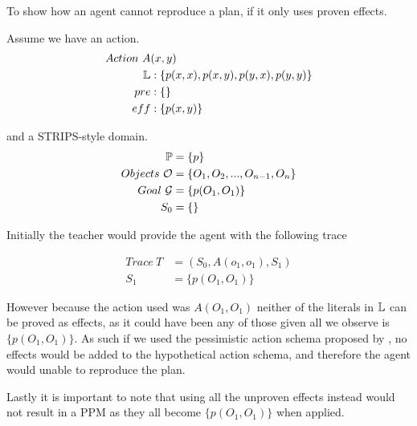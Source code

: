 \documentclass[\master/Master.tex]{subfiles}
\begin{document}
	\begin{example}
		To show how an agent cannot reproduce a plan, if it only uses proven effects.
		
		Assume we have an action.
		\begin{equation*}
			\begin{split}
				Action ~ A &(x, y) \\
					\mathbb{L}&: \{ p(x,x), p(x,y), p(y,x), p(y,y) \} \\
					pre&: \{\} \\
					eff&: \{p(x,y)\}			
			\end{split}
		\end{equation*}
		
		and a STRIPS-style domain.
		\begin{equation*}
			\begin{split}
				\mathbb{P} &= \{p\}		\\
				Objects~\mathcal{O} &= \{O_1,O_2,...,O_{n-1},O_n\} \\
				Goal~\mathcal{G} &= \{p(O_1,O_1)\} \\
				S_0 &=\{\}
			\end{split}
		\end{equation*}
		
		Initially the teacher would provide the agent with the following trace
		
		\begin{equation*}
			\begin{split}				
				Trace~T &= (S_0,A(o_1,o_1),S_1) \\
				S_1 &= \{p(O_1,O_1)\}				
			\end{split}
		\end{equation*}
		
		However because the action used was $A(O_1,O_1)$ neither of the literals in $\mathbb{L}$ can be proved as effects, as it could have been any of those given all we observe is $\{p(O_1,O_1)\}$. 
		As such if we used the pessimistic action schema proposed by \cite{Walsh2008}, no effects would be added to the hypothetical action schema, and therefore the agent would unable to reproduce the plan. 
		
		Lastly it is important to note that using all the unproven effects instead would not result in a PPM as they all become $\{p(O_1,O_1)\}$ when applied.
		
	\end{example}
	
\end{document}
